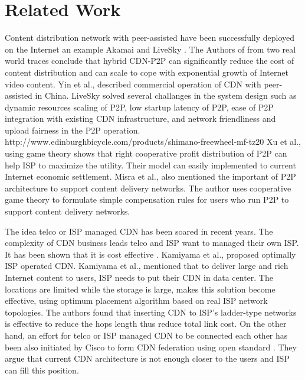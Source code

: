 \documentclass[paper]{ieice}
\begin{document}
\section{Related Work} 
Content distribution network with peer-assisted have been successfully deployed on the Internet an example Akamai \cite{Huang:2008:UHC:1496046.1496064} and LiveSky \cite{Yin:2010:LEC:1823746.1823750}.
The Authors of \cite{Huang:2008:UHC:1496046.1496064} from two real world traces conclude that hybrid CDN-P2P can significantly reduce the cost of content distribution and can scale to cope with exponential growth of Internet video content.
Yin et al., \cite{Yin:2010:LEC:1823746.1823750} described commercial operation of CDN with peer-assisted in China.   
LiveSky solved several challanges in the system design such as dynamic resources scaling of P2P, low startup latency of P2P, ease of P2P integration with existing CDN infrastructure, and network friendliness and upload fairness in the P2P operation. 
http://www.edinburghbicycle.com/products/shimano-freewheel-mf-tz20
Xu et al.,\cite{DBLP:journals/corr/abs-1212-4915} using game theory shows that right cooperative profit distribution of P2P can help ISP to maximize the utility. 
Their model can easily implemented to current Internet economic settlement.
Misra et al.,\cite{Misra:2010:IPS:1811099.1811064} also mentioned the important of P2P architecture to support content delivery networks. 
The author uses cooperative game theory to formulate simple compensation rules for users who run P2P to support content delivery networks.  

The idea telco or ISP managed CDN has been soared in recent years.  
The complexity of CDN business leads telco and ISP want to managed their own ISP.
It has been shown that it is cost effective \cite{federation}\cite{norton2011internet}. 
Kamiyama et al., \cite{NoriakiKAMIYAMA2013} proposed optimally ISP operated CDN. 
Kamiyama et al., mentioned that to deliver large and rich Internet content to users, ISP needs to put their CDN in data center.
The locations are limited while the storage is large, makes this solution become effective, using optimum placement algorithm based on real ISP network topologies.
The authors found that inserting CDN to ISP's ladder-type networks is effective to reduce the hops length thus reduce total link cost. 
On the other hand, an effort for telco or ISP managed CDN to be connected each other has been also initiated by Cisco to form CDN federation \cite{federation} using open standard \cite{cdni}.
They argue that current CDN architecture is not enough closer to the users and ISP can fill this position.   
\end{document}
